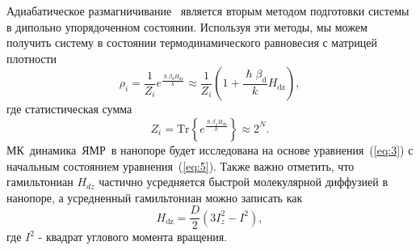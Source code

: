 \documentclass[utf8]{jetp}
\newcommand{\hdz}{H_\mathrm{dz}}
\begin{document}
Адиабатическое размагничивание~\cite{Goldman_1970,Slichter_1961} является вторым методом подготовки системы в дипольно упорядоченном состоянии.
Используя эти методы, мы можем получить систему в состоянии термодинамического равновесия с матрицей плотности
%
\begin{equation}
  \label{eq:5}
  \rho_i = \frac{1}{Z_i} e^\frac{\hslash\beta_\mathrm{d} \hdz}{k}
  \approx \frac{1}{Z_i}(1 + \frac{\hslash\beta_\mathrm{d}}{k} H_\mathrm{dz}),
\end{equation}
%
где статистическая сумма
%
\begin{equation}
  \label{eq:6}
	Z_i = \mathrm{Tr} \left\{ e^\frac{\hslash\beta_\mathrm{d} \hdz}{k} \right\} \approx 2^{N}.
\end{equation}
%
МК~динамика~ЯМР~в нанопоре будет исследована на основе уравнения~(\ref{eq:3}) с начальным состоянием уравнения~(\ref{eq:5}).
Также важно отметить, что гамильтониан $H_{dz}$ частично усредняется быстрой молекулярной диффузией в нанопоре, а усредненный гамильтониан можно записать как \cite{Fel_dman_2004,Doronin_2011}
%
\begin{equation}
  \label{eq:7}
  H_\mathrm{dz} = \dfrac{D}{2} (3 I^{2}_{z} - I^{2}) , %
\end{equation}
%
где $I^{2}$ - квадрат углового момента вращения.
\end{document}
